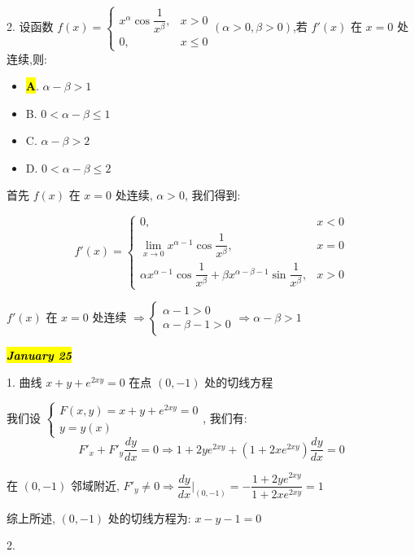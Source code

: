 2. 设函数 $f(x)=\begin{cases}
	x^{\alpha}\cos\dfrac{1}{x^{\beta}}, & x>0\\
	0,& x\leq 0
\end{cases}(\alpha>0,\beta>0)$,若 $f'(x)$ 在 $x=0$ 处连续,则:
\begin{itemize}
	\item \hl{\textbf{A}}. $\alpha-\beta>1$
	\item B. $0<\alpha-\beta\leq 1$
	\item C. $\alpha-\beta>2$
	\item D. $0<\alpha-\beta\leq 2$
\end{itemize}
\begin{solution}

	首先 $f(x)$ 在 $x = 0$ 处连续, $\alpha > 0$, 我们得到:

	$$f'(x) = 
	\begin{cases}
		0, & x< 0\\
		\lim\limits_{x\to 0} x^{\alpha -1}\cos\dfrac{1}{x^{\beta}}, & x = 0\\
		\alpha x^{\alpha -1}\cos \dfrac{1}{x^{\beta}} + \beta x^{\alpha-\beta-1}\sin \dfrac{1}{x^{\beta}}, & x > 0  
	\end{cases}$$

	$f'(x)$ 在 $x = 0$ 处连续 $\Rightarrow \begin{cases} \alpha - 1 >0\\ \alpha - \beta - 1 > 0\end{cases}\Rightarrow \alpha - \beta > 1$
\end{solution}

\hl{\textbf{\textit{January 25}}}

1. 曲线 $x+y+e^{2xy}=0$ 在点 $(0,-1)$ 处的切线方程
\begin{solution}

	我们设 $\begin{cases}
		F(x,y) = x + y + e^{2xy} = 0\\
		y = y(x)
	\end{cases}$, 我们有:
	$$F'_{x} + F'_{y}\dfrac{dy}{dx} = 0\Rightarrow 1+2ye^{2xy}+(1+2xe^{2xy})\dfrac{dy}{dx} =0$$

	在 $(0,-1)$ 邻域附近, $F'_{y}\neq 0\Rightarrow \dfrac{dy}{dx}\big|_{(0,-1)} = -\dfrac{1+2ye^{2xy}}{1+2xe^{2xy}} = 1$

	综上所述, $(0,-1)$ 处的切线方程为: $x - y - 1 = 0$
\end{solution}

2.

